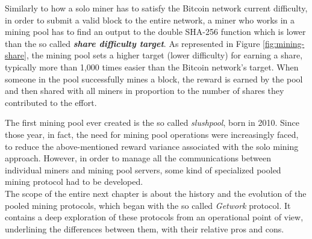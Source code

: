 Similarly to how a solo miner has to satisfy the Bitcoin network current difficulty, in order to submit a valid block to the entire network, a miner who works in a mining pool has to find an output to the double SHA-256 function which is lower than the so called \textbf{\textit{share difficulty target}}. As represented in Figure \ref{fig:mining-share}, the mining pool sets a higher target (lower difficulty) for earning a share, typically more than 1,000 times easier than the Bitcoin network's target. When someone in the pool successfully mines a block, the reward is earned by the pool and then shared with all miners in proportion to the number of shares they contributed to the effort.\medskip

\noindent The first mining pool ever created is the so called \textit{slushpool}, born in 2010. Since those year, in fact, the need for mining pool operations were increasingly faced, to reduce the above-mentioned reward variance associated with the solo mining approach. However, in order to manage all the communications between individual miners and mining pool servers, some kind of specialized pooled mining protocol had to be developed.\\
The scope of the entire next chapter is about the history and the evolution of the pooled mining protocols, which began with the so called \textit{Getwork} protocol. It contains a deep exploration of these protocols from an operational point of view, underlining the differences between them, with their relative pros and cons.
